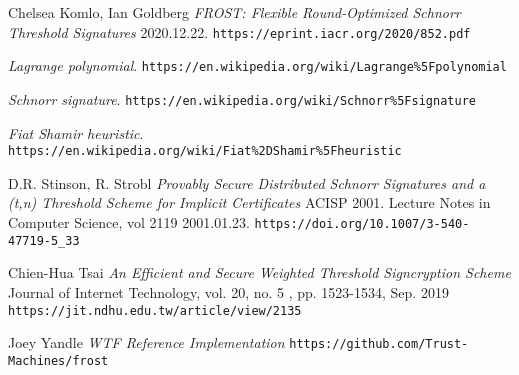 \documentclass{article}
\begin{document}
\begin{thebibliography}{7}

  Chelsea Komlo, Ian Goldberg
  \emph{FROST: Flexible Round-Optimized Schnorr Threshold Signatures} 2020.12.22.
  \texttt{https://eprint.iacr.org/2020/852.pdf}

  \emph{Lagrange polynomial}.
  \texttt{https://en.wikipedia.org/wiki/Lagrange\%5Fpolynomial}

  \emph{Schnorr signature}.
  \texttt{https://en.wikipedia.org/wiki/Schnorr\%5Fsignature}

  \emph{Fiat Shamir heuristic}.
  \texttt{https://en.wikipedia.org/wiki/Fiat\%2DShamir\%5Fheuristic}

  D.R. Stinson, R. Strobl
  \emph{Provably Secure Distributed Schnorr Signatures and a (t,n) Threshold Scheme for Implicit Certificates} ACISP 2001. Lecture Notes in Computer Science, vol 2119 2001.01.23.
  \texttt{https://doi.org/10.1007/3-540-47719-5\_33}

  Chien-Hua Tsai
  \emph{An Efficient and Secure Weighted Threshold Signcryption Scheme} Journal of Internet Technology, vol. 20, no. 5 , pp. 1523-1534, Sep. 2019
  \texttt{https://jit.ndhu.edu.tw/article/view/2135}

  Joey Yandle
  \emph{WTF Reference Implementation}
  \texttt{https://github.com/Trust-Machines/frost}

\end{thebibliography}
\end{document}
